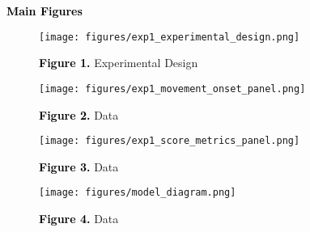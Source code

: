 \documentclass[12pt,letterpaper]{article}
\newcommand{\SethCaption}[2]{\noindent\textbf{\textcolor{black}{#1}} {#2}}
\newcommand{\SectionHeader}[1]{\noindent\textbf{\Large{\textcolor{black}{#1}}}\normalsize }
\begin{document}
\SectionHeader{Main Figures}

\begin{figure}[H]
    \centering
    \texttt{[image: figures/exp1\_experimental\_design.png]}
    
    \SethCaption{Figure 1.}{Experimental Design}
\end{figure}
\begin{figure}[H]
    \centering
    \texttt{[image: figures/exp1\_movement\_onset\_panel.png]}
    
    \SethCaption{Figure 2.}{Data}
\end{figure}
\begin{figure}[H]
    \centering
    \texttt{[image: figures/exp1\_score\_metrics\_panel.png]}
    
    \SethCaption{Figure 3.}{Data}
\end{figure}

\begin{figure}[H]
    \centering
    \texttt{[image: figures/model\_diagram.png]}
    
    \SethCaption{Figure 4.}{Data}
\end{figure}
\end{document}
